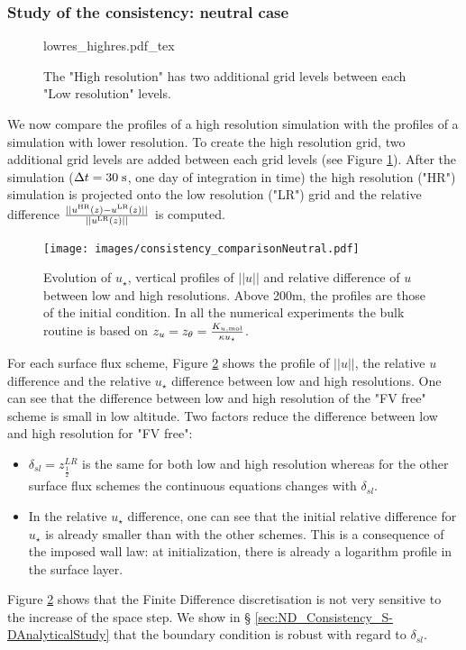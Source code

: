\subsubsection{Study of the consistency: neutral case}
\begin{figure}
	\centering
	{lowres_highres.pdf_tex}
	\caption{The "High resolution" has two additional grid levels
	between each "Low resolution" levels.}
	\label{fig:ND_Consistency_lowres_highres}
\end{figure}
We now compare the profiles of a high
resolution simulation with the profiles
of a simulation with lower resolution. To create the high resolution grid,
two additional grid levels are added between each grid levels
(see Figure \ref{fig:ND_Consistency_lowres_highres}).
After the simulation ($\Delta t=30\;{\rm s}$,
one day of integration in time) the high resolution ("HR") simulation
is projected onto the low resolution ("LR") grid and the relative difference
$\frac{||u^{\rm HR}(z) - u^{\rm LR}(z)||}{||u^{\rm LR}(z)||}$ is
computed.
\begin{figure}
	\centering
	\texttt{[image: images/consistency\_comparisonNeutral.pdf]}
	\caption{ Evolution of $u_\star$, vertical profiles of $||u||$
	and relative difference of $u$ between low and high resolutions.
	Above 200m, the profiles are those of the initial condition.
	In all the numerical experiments the bulk routine is based on
	$z_u = z_\theta = \frac{K_{u, \rm mol}}{\kappa u_\star}$.
	}
	\label{fig:ND_Consistency_Neutral}
\end{figure}
For each surface flux scheme, Figure \ref{fig:ND_Consistency_Neutral}
shows the profile of $||u||$,
the relative $u$ difference and the relative $u_\star$ difference
between low and high resolutions.
One can see that the difference between low and high resolution of
the "FV free" scheme is small in low altitude.
Two factors reduce the difference between low and high resolution
for "FV free":
\begin{itemize}
	\item $\delta_{sl} = z_{\frac{1}{2}}^{LR}$ is the same
		for both low and high resolution whereas for
		the other surface flux schemes the continuous
		equations changes with $\delta_{sl}$.
	\item In the relative $u_\star$ difference, one can see
		that the initial relative difference for
		$u_\star$ is already smaller than with the
		other schemes. This is a consequence of the
		imposed wall law: at initialization, there
		is already a logarithm profile in the
		surface layer.
\end{itemize}
Figure \ref{fig:ND_Consistency_Neutral} shows that the
Finite Difference discretisation is not very sensitive
to the increase of the space step. We show in \S
\ref{sec:ND_Consistency_S-DAnalyticalStudy} that
the boundary condition is robust with regard to
$\delta_{sl}$.
